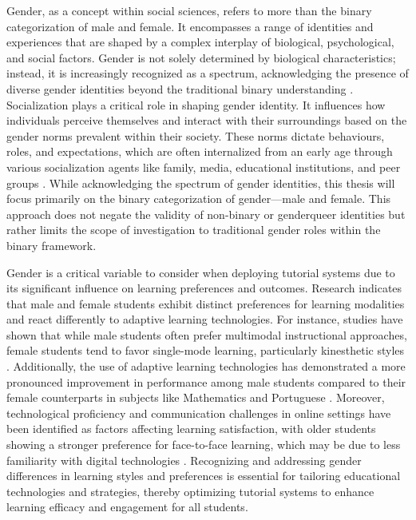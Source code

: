 Gender, as a concept within social sciences, refers to more than the binary categorization of male and female.
It encompasses a range of identities and experiences that are shaped by a complex interplay of biological, psychological, and social factors.
Gender is not solely determined by biological characteristics; instead, it is increasingly recognized as a spectrum, acknowledging the presence of diverse gender identities beyond the traditional binary understanding \parencite{lindqvistWhatGenderAnyway2021}.
Socialization plays a critical role in shaping gender identity. It influences how individuals perceive themselves and interact with their surroundings based on the gender norms prevalent within their society.
These norms dictate behaviours, roles, and expectations, which are often internalized from an early age through various socialization agents like family, media, educational institutions, and peer groups \parencite{kampshoffHandbuchGeschlechterforschungUnd2012}.
While acknowledging the spectrum of gender identities, this thesis will focus primarily on the binary categorization of gender—male and female.
This approach does not negate the validity of non-binary or genderqueer identities but rather limits the scope of investigation to traditional gender roles within the binary framework.

Gender is a critical variable to consider when deploying tutorial systems due to its significant influence on learning preferences and outcomes.
Research indicates that male and female students exhibit distinct preferences for learning modalities and react differently to adaptive learning technologies.
For instance, studies have shown that while male students often prefer multimodal instructional approaches, female students tend to favor single-mode learning, particularly kinesthetic styles \parencite{wehrweinGenderDifferencesLearning2007}.
Additionally, the use of adaptive learning technologies has demonstrated a more pronounced improvement in performance among male students compared to their female counterparts in subjects like Mathematics and Portuguese \parencite{desantanaEvaluatingImpactMars2016}.
Moreover, technological proficiency and communication challenges in online settings have been identified as factors affecting learning satisfaction, with older students showing a stronger preference for face-to-face learning, which may be due to less familiarity with digital technologies \parencite{dabajRoleGenderAge2009}.
Recognizing and addressing gender differences in learning styles and preferences is essential for tailoring educational technologies and strategies, thereby optimizing tutorial systems to enhance learning efficacy and engagement for all students.

